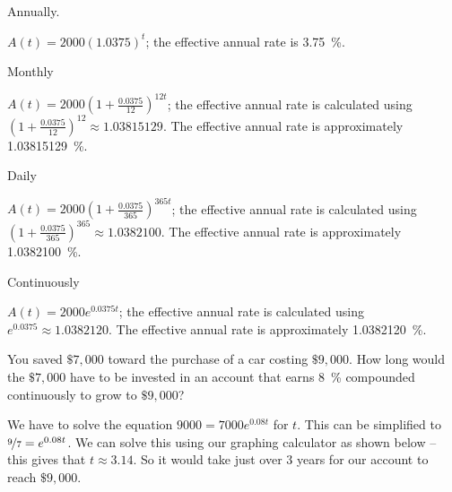 \begin{exercises}
\begin{problem}
\begin{multicols}{4}
	\begin{subproblem}
		Annually. 
		\begin{shortsolution}
			$A(t)=2000(1.0375)^t$; the effective annual rate is \SI{3.75}{\percent}. 
		\end{shortsolution}
	\end{subproblem}
	\begin{subproblem}
		Monthly 
		\begin{shortsolution}
			$A(t)=2000\left( 1+\frac{0.0375}{12} \right)^{12t}$; the effective annual rate is 
			calculated using $\left( 1+\frac{0.0375}{12} \right)^{12}\approx 1.03815129$. The 
			effective annual rate is approximately \SI{1.03815129}{\percent}.
		\end{shortsolution}
	\end{subproblem}
	\begin{subproblem}
		Daily 
		\begin{shortsolution}
			$A(t)=2000\left( 1+\frac{0.0375}{365} \right)^{365t}$; the effective annual rate is 
			calculated using $\left( 1+\frac{0.0375}{365} \right)^{365}\approx 1.0382100$. The 
			effective annual rate is approximately \SI{1.0382100}{\percent}.
		\end{shortsolution}
	\end{subproblem}
	\begin{subproblem}
		Continuously 
		\begin{shortsolution}
			$A(t)=2000e^{0.0375t}$; the effective annual rate is calculated using $e^{0.0375}\approx 1.0382120$.
			The effective annual rate is approximately \SI{1.0382120}{\percent}.
		\end{shortsolution}
	\end{subproblem}
\end{multicols}
\end{problem}
\begin{problem}
You saved $\$7,000$ toward the purchase of a car costing $\$9,000$. 
How long would the $\$7,000$ have to be invested in an account that 
earns \SI{8}{\percent} compounded continuously to grow to $\$9,000$?
\begin{shortsolution}
	We have to solve the equation $9000=7000e^{0.08t}$ for $t$. This can 
	be simplified to $\nicefrac{9}{7}=e^{0.08t}$.  We can solve this 
	using our graphing calculator as shown below -- this gives that $t\approx 3.14$. 
	So it would take just over $3$ years for our account to reach $\$9,000$.
											

\end{shortsolution}
\end{problem}
\end{exercises}

